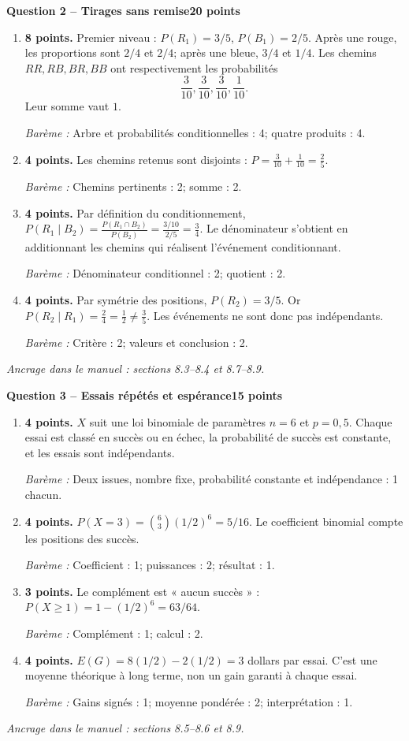 \documentclass[11pt,a4paper]{article}
\begin{document}
\newpage
{\large\bfseries Question 2 -- Tirages sans remise}\hfill\textbf{20 points}\par
\begin{enumerate}
\item \textbf{8 points.} Premier niveau : \(P(R_1)=3/5\), \(P(B_1)=2/5\). Après une rouge, les proportions sont \(2/4\) et \(2/4\); après une bleue, \(3/4\) et \(1/4\). Les chemins \(RR,RB,BR,BB\) ont respectivement les probabilités \[\frac3{10},\frac3{10},\frac3{10},\frac1{10}.\] Leur somme vaut \(1\).
\par{\small\textit{Barème : }Arbre et probabilités conditionnelles : 4; quatre produits : 4.}
\item \textbf{4 points.} Les chemins retenus sont disjoints : \(P=\frac3{10}+\frac1{10}=\frac25\).
\par{\small\textit{Barème : }Chemins pertinents : 2; somme : 2.}
\item \textbf{4 points.} Par définition du conditionnement, \(P(R_1\mid B_2)=\frac{P(R_1\cap B_2)}{P(B_2)}=\frac{3/10}{2/5}=\frac34\). Le dénominateur s’obtient en additionnant les chemins qui réalisent l’événement conditionnant.
\par{\small\textit{Barème : }Dénominateur conditionnel : 2; quotient : 2.}
\item \textbf{4 points.} Par symétrie des positions, \(P(R_2)=3/5\). Or \(P(R_2\mid R_1)=\frac24=\frac12\ne\frac35\). Les événements ne sont donc pas indépendants.
\par{\small\textit{Barème : }Critère : 2; valeurs et conclusion : 2.}
\end{enumerate}
\vfill {\small\textit{Ancrage dans le manuel : sections 8.3--8.4 et 8.7--8.9.}}

\newpage
{\large\bfseries Question 3 -- Essais répétés et espérance}\hfill\textbf{15 points}\par
\begin{enumerate}
\item \textbf{4 points.} \(X\) suit une loi binomiale de paramètres \(n=6\) et \(p=0{,}5\). Chaque essai est classé en succès ou en échec, la probabilité de succès est constante, et les essais sont indépendants.
\par{\small\textit{Barème : }Deux issues, nombre fixe, probabilité constante et indépendance : 1 chacun.}
\item \textbf{4 points.} \(P(X=3)=\binom63(1/2)^6=5/16\). Le coefficient binomial compte les positions des succès.
\par{\small\textit{Barème : }Coefficient : 1; puissances : 2; résultat : 1.}
\item \textbf{3 points.} Le complément est « aucun succès » : \(P(X\ge1)=1-(1/2)^6=63/64\).
\par{\small\textit{Barème : }Complément : 1; calcul : 2.}
\item \textbf{4 points.} \(E(G)=8(1/2)-2(1/2)=3\) dollars par essai. C’est une moyenne théorique à long terme, non un gain garanti à chaque essai.
\par{\small\textit{Barème : }Gains signés : 1; moyenne pondérée : 2; interprétation : 1.}
\end{enumerate}
\vfill {\small\textit{Ancrage dans le manuel : sections 8.5--8.6 et 8.9.}}
\end{document}
